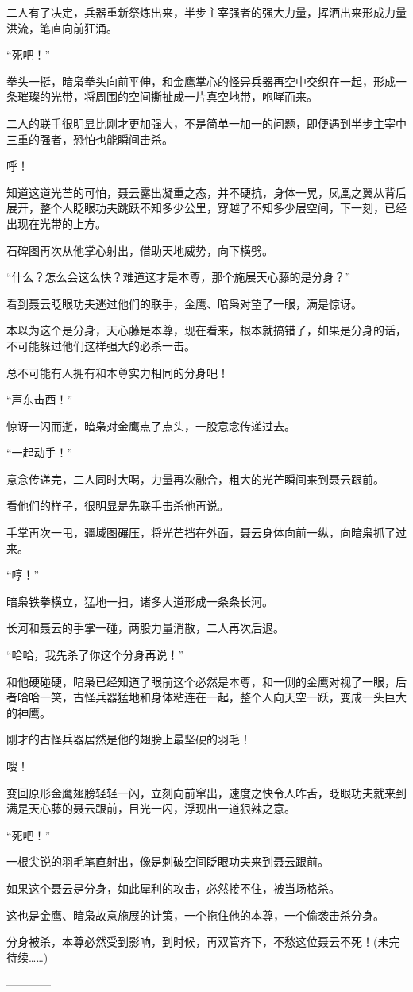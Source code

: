 \begin{this_body}
二人有了决定，兵器重新祭炼出来，半步主宰强者的强大力量，挥洒出来形成力量洪流，笔直向前狂涌。

“死吧！”

拳头一挺，暗枭拳头向前平伸，和金鹰掌心的怪异兵器再空中交织在一起，形成一条璀璨的光带，将周围的空间撕扯成一片真空地带，咆哮而来。

二人的联手很明显比刚才更加强大，不是简单一加一的问题，即便遇到半步主宰中三重的强者，恐怕也能瞬间击杀。

呼！

知道这道光芒的可怕，聂云露出凝重之态，并不硬抗，身体一晃，凤凰之翼从背后展开，整个人眨眼功夫跳跃不知多少公里，穿越了不知多少层空间，下一刻，已经出现在光带的上方。

石碑图再次从他掌心射出，借助天地威势，向下横劈。

“什么？怎么会这么快？难道这才是本尊，那个施展天心藤的是分身？”

看到聂云眨眼功夫逃过他们的联手，金鹰、暗枭对望了一眼，满是惊讶。

本以为这个是分身，天心藤是本尊，现在看来，根本就搞错了，如果是分身的话，不可能躲过他们这样强大的必杀一击。

总不可能有人拥有和本尊实力相同的分身吧！

“声东击西！”

惊讶一闪而逝，暗枭对金鹰点了点头，一股意念传递过去。

“一起动手！”

意念传递完，二人同时大喝，力量再次融合，粗大的光芒瞬间来到聂云跟前。

看他们的样子，很明显是先联手击杀他再说。

手掌再次一甩，疆域图碾压，将光芒挡在外面，聂云身体向前一纵，向暗枭抓了过来。

“哼！”

暗枭铁拳横立，猛地一扫，诸多大道形成一条条长河。

长河和聂云的手掌一碰，两股力量消散，二人再次后退。

“哈哈，我先杀了你这个分身再说！”

和他硬碰硬，暗枭已经知道了眼前这个必然是本尊，和一侧的金鹰对视了一眼，后者哈哈一笑，古怪兵器猛地和身体粘连在一起，整个人向天空一跃，变成一头巨大的神鹰。

刚才的古怪兵器居然是他的翅膀上最坚硬的羽毛！

嗖！

变回原形金鹰翅膀轻轻一闪，立刻向前窜出，速度之快令人咋舌，眨眼功夫就来到满是天心藤的聂云跟前，目光一闪，浮现出一道狠辣之意。

“死吧！”

一根尖锐的羽毛笔直射出，像是刺破空间眨眼功夫来到聂云跟前。

如果这个聂云是分身，如此犀利的攻击，必然接不住，被当场格杀。

这也是金鹰、暗枭故意施展的计策，一个拖住他的本尊，一个偷袭击杀分身。

分身被杀，本尊必然受到影响，到时候，再双管齐下，不愁这位聂云不死！(未完待续……)

------------

\end{this_body}

